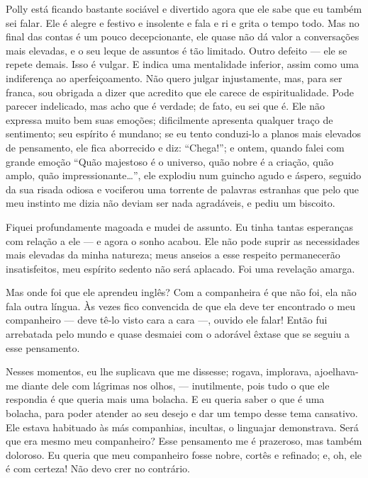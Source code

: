  Polly está ficando bastante sociável e divertido agora que ele sabe que eu também sei falar. Ele é alegre e festivo e insolente
e fala e ri e grita o tempo todo. Mas no final das contas é um pouco decepcionante, ele quase não dá valor a conversações mais elevadas,
e o seu leque de assuntos é tão limitado. Outro defeito --- ele se repete demais. Isso é vulgar. E indica uma mentalidade inferior, assim como
uma indiferença ao aperfeiçoamento. Não quero julgar injustamente, mas, para ser franca, sou obrigada a dizer que acredito que ele carece de
espiritualidade. Pode parecer indelicado, mas acho que é verdade; de fato, eu sei que é. Ele não expressa muito bem suas emoções; dificilmente apresenta qualquer
traço de sentimento; seu espírito é mundano; se eu tento conduzi-lo a planos mais elevados de pensamento, ele fica
aborrecido e diz: ``Chega!''; e ontem, quando falei com grande emoção ``Quão majestoso é o universo, quão nobre é a criação, quão amplo,
quão impressionante\ldots{}'', ele explodiu num guincho agudo e áspero, seguido da sua risada odiosa e vociferou uma torrente de palavras estranhas
que pelo que meu instinto me dizia não deviam ser nada agradáveis, e pediu um biscoito.

Fiquei profundamente magoada e mudei de assunto. Eu tinha tantas esperanças com relação a ele --- e agora o sonho acabou.
Ele não pode suprir as necessidades mais elevadas da minha natureza; meus anseios a esse respeito permanecerão insatisfeitos,
meu espírito sedento não será aplacado. Foi uma revelação amarga.

Mas onde foi que ele aprendeu inglês? Com a companheira é que não foi, ela não fala outra língua. Às vezes fico convencida de que
ela deve ter encontrado o meu companheiro --- deve tê-lo visto cara a cara ---, ouvido ele falar! Então fui arrebatada pelo mundo e quase desmaiei com
o adorável êxtase que se seguiu a esse pensamento.

Nesses momentos, eu lhe suplicava que me dissesse; rogava, implorava,
ajoelhava-me diante dele com lágrimas nos olhos, --- inutilmente, pois tudo o
que ele respondia é que queria mais uma bolacha. E eu queria saber o que é uma
bolacha, para poder atender ao seu desejo e dar um tempo desse tema cansativo.
Ele estava habituado às más companhias, incultas, o linguajar demonstrava. Será
que era mesmo meu companheiro? Esse pensamento me é prazeroso, mas também
doloroso. Eu queria que meu companheiro fosse nobre, cortês e refinado; e, oh,
ele é com certeza! Não devo crer no contrário.

